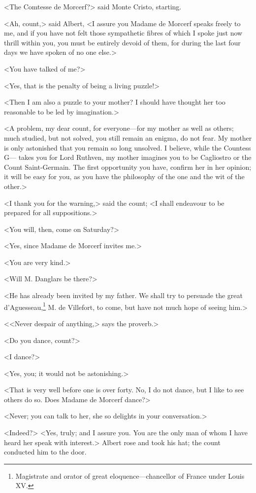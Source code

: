  <The Comtesse de Morcerf?> said Monte Cristo, starting. 

 <Ah, count,> said Albert, <I assure you Madame de Morcerf speaks freely to me, and if you have not felt those sympathetic fibres of which I spoke just now thrill within you, you must be entirely devoid of them, for during the last four days we have spoken of no one else.> 

 <You have talked of me?> 

 <Yes, that is the penalty of being a living puzzle!> 

 <Then I am also a puzzle to your mother? I should have thought her too reasonable to be led by imagination.> 

 <A problem, my dear count, for everyone—for my mother as well as others; much studied, but not solved, you still remain an enigma, do not fear. My mother is only astonished that you remain so long unsolved. I believe, while the Countess G— takes you for Lord Ruthven, my mother imagines you to be Cagliostro or the Count Saint-Germain. The first opportunity you have, confirm her in her opinion; it will be easy for you, as you have the philosophy of the one and the wit of the other.> 

 <I thank you for the warning,> said the count; <I shall endeavour to be prepared for all suppositions.> 

 <You will, then, come on Saturday?> 

 <Yes, since Madame de Morcerf invites me.> 

 <You are very kind.> 

 <Will M. Danglars be there?> 

 <He has already been invited by my father. We shall try to persuade the great d'Aguesseau,\footnote{Magistrate and orator of great eloquence—chancellor of France under Louis XV. } M. de Villefort, to come, but have not much hope of seeing him.> 

 <<Never despair of anything,> says the proverb.> 

 <Do you dance, count?> 

 <I dance?> 

 <Yes, you; it would not be astonishing.> 

 <That is very well before one is over forty. No, I do not dance, but I like to see others do so. Does Madame de Morcerf dance?> 

 <Never; you can talk to her, she so delights in your conversation.> 

 <Indeed?>  <Yes, truly; and I assure you. You are the only man of whom I have heard her speak with interest.> Albert rose and took his hat; the count conducted him to the door. 

